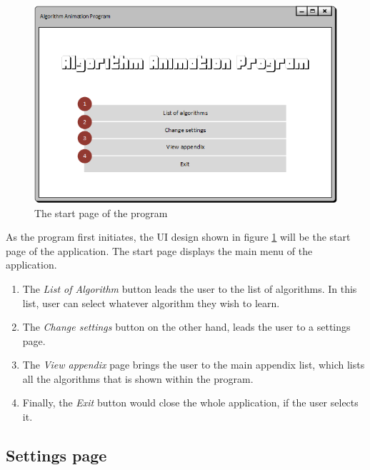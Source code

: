 \begin{figure}[H]
\centering
\includegraphics[scale=1]{images/report_images/uiStartWindow.png}
\caption{The start page of the program}
\label{uiStartWindow}
\end{figure}

As the program first initiates, the UI design shown in figure \ref{uiStartWindow} will be the start page of the application. The start page displays the main menu of the application. 

\begin{enumerate}
\item The \textit{List of Algorithm} button leads the user to the list of algorithms. In this list, user can select whatever algorithm they wish to learn. 
\item The \textit{Change settings} button on the other hand, leads the user to a settings page.
\item The \textit{View appendix} page brings the user to the main appendix list, which lists all the algorithms that is shown within the program.
\item Finally, the \textit{Exit} button would close the whole application, if the user selects it.
\end{enumerate}

\newpage

\subsection{Settings page}

